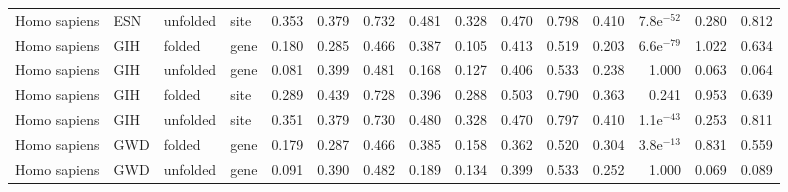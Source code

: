 \begin{longtable}{llllrrrrrrrrrrr}
        Homo sapiens &                       ESN &  unfolded &  site &                              0.353 &                               0.379 &                 0.732 &                 0.481 &                              0.328 &                               0.470 &                 0.798 &                 0.410 &  7.8e$^{-52}$ &  0.280 &  0.812 \\
        Homo sapiens &                       GIH &    folded &  gene &                              0.180 &                               0.285 &                 0.466 &                 0.387 &                              0.105 &                               0.413 &                 0.519 &                 0.203 &  6.6e$^{-79}$ &  1.022 &  0.634 \\
        Homo sapiens &                       GIH &  unfolded &  gene &                              0.081 &                               0.399 &                 0.481 &                 0.168 &                              0.127 &                               0.406 &                 0.533 &                 0.238 &         1.000 &  0.063 &  0.064 \\
        Homo sapiens &                       GIH &    folded &  site &                              0.289 &                               0.439 &                 0.728 &                 0.396 &                              0.288 &                               0.503 &                 0.790 &                 0.363 &         0.241 &  0.953 &  0.639 \\
        Homo sapiens &                       GIH &  unfolded &  site &                              0.351 &                               0.379 &                 0.730 &                 0.480 &                              0.328 &                               0.470 &                 0.797 &                 0.410 &  1.1e$^{-43}$ &  0.253 &  0.811 \\
        Homo sapiens &                       GWD &    folded &  gene &                              0.179 &                               0.287 &                 0.466 &                 0.385 &                              0.158 &                               0.362 &                 0.520 &                 0.304 &  3.8e$^{-13}$ &  0.831 &  0.559 \\
        Homo sapiens &                       GWD &  unfolded &  gene &                              0.091 &                               0.390 &                 0.482 &                 0.189 &                              0.134 &                               0.399 &                 0.533 &                 0.252 &         1.000 &  0.069 &  0.089 \\

\end{longtable}
